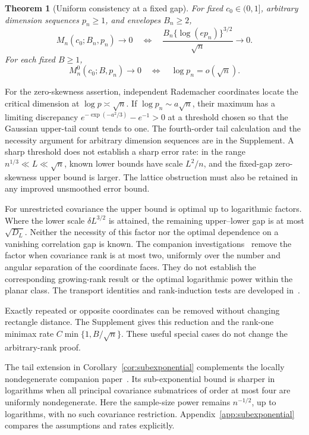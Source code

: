 \documentclass[11pt,letterpaper]{article}
\newtheorem{theorem}{Theorem}
\theoremstyle{remark}
\begin{document}
\begin{theorem}[Uniform consistency at a fixed gap]
\label{opt:consistency}
For fixed \(c_0\in(0,1]\), arbitrary dimension sequences \(p_n\ge1\),
and envelopes \(B_n\ge2\),
\begin{equation}
 M_n(c_0;B_n,p_n)\longrightarrow0
 \quad\Longleftrightarrow\quad
 \frac{B_n\{\log(ep_n)\}^{3/2}}{\sqrt n}\longrightarrow0.
 \label{opt:consistency-iff}
\end{equation}
For each fixed \(B\ge1\),
\[
 M_n^0(c_0;B,p_n)\longrightarrow0
 \quad\Longleftrightarrow\quad \log p_n=o(\sqrt n).
\]
\end{theorem}

For the zero-skewness assertion, independent Rademacher coordinates
locate the critical dimension at
\(\log p\asymp\sqrt n\). If \(\log p_n\sim a\sqrt n\), their
maximum has a limiting discrepancy
\(e^{-\exp(-a^2/3)}-e^{-1}>0\) at a threshold chosen so that the
Gaussian upper-tail count tends to one. The fourth-order tail
calculation and the necessity argument for
arbitrary dimension sequences are in the Supplement. A sharp threshold
does not establish a sharp error rate: in the range
\(n^{1/3}\ll L\ll\sqrt n\), known lower bounds have scale
\(L^2/n\), and the fixed-gap zero-skewness upper bound is larger.
The lattice obstruction must also be retained in any improved
unsmoothed error bound.

For unrestricted covariance the upper bound is optimal up to
logarithmic factors. Where the lower scale \(\delta L^{3/2}\) is
attained, the remaining upper--lower gap is at most
\(\sqrt{D_L}\). Neither the necessity of this factor nor the optimal
dependence on a vanishing correlation gap is known. The companion
investigations~\cite{Cancellation} remove the factor when covariance
rank is at most two, uniformly over the number and angular separation
of the coordinate faces. They do not establish the corresponding
growing-rank result or the optimal logarithmic power within the planar
class. The transport identities and rank-induction tests are developed
in~\cite{Cancellation}.

Exactly repeated or opposite coordinates can be removed without
changing rectangle distance. The Supplement gives this reduction and
the rank-one minimax rate \(C\min\{1,B/\sqrt n\}\). These useful
special cases do not change the arbitrary-rank proof.

The tail extension in Corollary~\ref{cor:subexponential} complements the
locally nondegenerate companion paper~\cite{Local}. Its sub-exponential
bound is sharper in logarithms when all principal covariance submatrices
of order at most four are uniformly nondegenerate. Here the sample-size
power remains \(n^{-1/2}\), up to logarithms, with no such covariance
restriction. Appendix~\ref{app:subexponential} compares the assumptions and rates explicitly.
\end{document}
